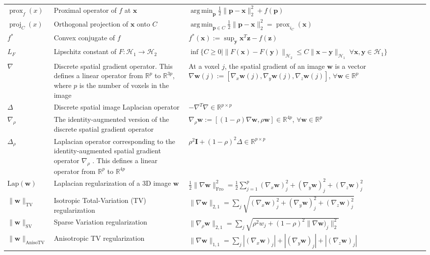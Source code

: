 \documentclass[nobib, a4paper, notoc, twoside, justified, openany]{tufte-book}
\DeclareMathOperator*{\argmin}{arg\,min}
\providecommand{\B}[1]{\mathbf{#1}}
\DeclareMathOperator{\proj}{proj}
\DeclareMathOperator{\prox}{prox}
\def\y{\mathbf{y}}
\def\I{\mathbf{I}}
\def\x{\mathbf{x}}
\def\w{\mathbf{w}}
\begin{document}
\begin{fullwidth}
\begin{longtable}{p{2cm} | p{6cm} | p{9cm}}
  $\prox_f(x)$ & Proximal operator of $f$ at $\B{x}$ & $\argmin_{\B{p}}\frac{1}{2}\|\B{p}-\B{x}\|_2^2 + f(\B{p})$\\

  $\proj_C(x)$ & Orthogonal projection of $\B{x}$ onto $C$ & $\argmin_{\B{p} \in C}\frac{1}{2}\|\B{p}-\B{x}\|_2^2 = \prox_{i_C}(\B{x})$\\
  $f^*$ & Convex conjugate of $f$ & $f^*(\B{x}) := \sup_{\B{y}}\B{x}^T\B{z} - f(\B{z})$\\
  $L_F$ & Lipschitz constant of $F: \mathcal H_1 \rightarrow \mathcal H_2$ & $\inf\{C \ge 0 | \|F(\x) - F(\y)\|_{\mathcal H_2} \le C\|\x - \y\|_{\mathcal H_1}\;\forall \x,\y \in \mathcal H_1\}$ \\
  \midrule

  $\nabla $ & Discrete spatial gradient operator. This defines a linear operator from $\mathbb R^p$ to $\mathbb R^{3p}$, where $p$ is the number of voxels in the image & At a voxel $j$, the spatial gradient of an image $\B{w}$ is a vector ${\nabla } {\w}(j) := [\nabla_{x} {\w}(j), \nabla_{y} {\w}(j), \nabla_{z} {\w}(j)]$, $\forall \w \in \mathbb R^p$ \\
  
  $\Delta$ & Discrete spatial image Laplacian operator & $-\nabla ^T\nabla  \in \mathbb R^{p \times p}$\\
  $\nabla_\rho$ & The identity-augmented version of the discrete spatial gradient operator & ${\nabla_\rho} {\w} := [(1-\rho)\nabla \w, \rho \w] \in \mathbb R^{4p}$, $\forall \w \in \mathbb R^p$ \\
  $\Delta_\rho$ & Laplacian operator corresponding to the identity-augmented spatial gradient operator $\nabla_\rho$ . This defines a linear operator from $\mathbb R^p$ to $\mathbb R^{4p}$ & $\rho^2\I + (1-\rho)^2\Delta \in \mathbb R^{p \times p}$ \\
  
  $\text{Lap}(\B{w})$ & Laplacian regularization of a 3D image $\B{w}$ & $\frac{1}{2}\|\nabla \w\|_\text{Fro}^2 = \frac{1}{2}\sum_{j=1}^p(\nabla_x \B{w})_j^2 + (\nabla_y \B{w})_j^2 + (\nabla_z \B{w})_j^2$ \\ %
  $\|\B{w}\|_{\text{TV}}$ & Isotropic Total-Variation (TV) regularization & $\|\nabla \w\|_{2,1} =
\sum_{j}\sqrt{(\nabla_x \B{w})_j^2 + (\nabla_y \B{w})_j^2 + (\nabla_z \B{w})_j^2}$\\
  $\|\B{w}\|_{\text{SV}}$ & Sparse Variation regularization & $\|\nabla_\rho \w\|_{2,1} = \sum_{j}\sqrt{\rho^2 w_j + (1-\rho)^2\|\nabla \w)_j\|_2^2}$\\  
  $\|\B{w}\|_{\text{AnisoTV}}$ & Anisotropic TV regularization & $\|\nabla \w\|_{1,1} = 
\sum_{j}|(\nabla_x \B{w})_j| + |(\nabla_y \B{w})_j| + |(\nabla_z \B{w})_j|$\\
  

  

 \bottomrule
\end{longtable}
\end{fullwidth}
\end{document}

